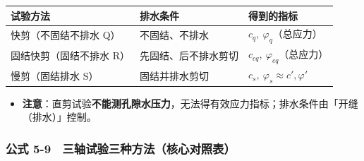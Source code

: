 \documentclass[
]{article}
\newcounter{none} %
\providecommand{\tightlist}{%
  \setlength{\itemsep}{0pt}\setlength{\parskip}{0pt}}
\begin{document}
{\def\LTcaptype{none} %
\begin{longtable}[]{@{}
  >{\raggedright\arraybackslash}p{}
  >{\raggedright\arraybackslash}p{}
  >{\raggedright\arraybackslash}p{}@{}}
\toprule\noalign{}
\begin{minipage}[b]{\linewidth}\raggedright
试验方法
\end{minipage} & \begin{minipage}[b]{\linewidth}\raggedright
排水条件
\end{minipage} & \begin{minipage}[b]{\linewidth}\raggedright
得到的指标
\end{minipage} \\
\midrule\noalign{}
\endhead
\bottomrule\noalign{}
\endlastfoot
快剪（不固结不排水 Q） & 不固结、不排水 &
\(c_q,\ \varphi_q\)（总应力） \\
固结快剪（固结不排水 R） & 先固结、后不排水剪切 &
\(c_{cq},\ \varphi_{cq}\)（总应力） \\
慢剪（固结排水 S） & 固结并排水剪切 &
\(c_s,\ \varphi_s\approx c',\varphi'\) \\
\end{longtable}
}

\begin{itemize}
\tightlist
\item
  \textbf{注意}：直剪试验\textbf{不能测孔隙水压力}，无法得有效应力指标；排水条件由「开缝（排水）」控制。
\end{itemize}

\subsubsection{公式
5-9　三轴试验三种方法（核心对照表）}\label{ux516cux5f0f-5-9-ux4e09ux8f74ux8bd5ux9a8cux4e09ux79cdux65b9ux6cd5ux6838ux5fc3ux5bf9ux7167ux8868}
\end{document}
